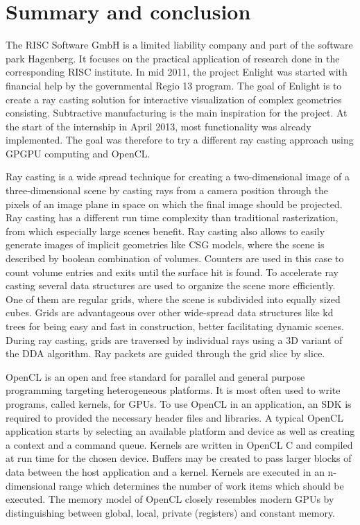 \section{Summary and conclusion}
\label{sec:summary}

The RISC Software GmbH is a limited liability company and part of the software park Hagenberg. It focuses on the practical application of research done in the corresponding RISC institute. In mid 2011, the project Enlight was started with financial help by the governmental Regio 13 program. The goal of Enlight is to create a ray casting solution for interactive visualization of complex geometries consisting. Subtractive manufacturing is the main inspiration for the project. At the start of the internship in April 2013, most functionality was already implemented. The goal was therefore to try a different ray casting approach using GPGPU computing and OpenCL.

Ray casting is a wide spread technique for creating a two-dimensional image of a three-dimensional scene by casting rays from a camera position through the pixels of an image plane in space on which the final image should be projected. Ray casting has a different run time complexity than traditional rasterization, from which especially large scenes benefit. Ray casting also allows to easily generate images of implicit geometries like CSG models, where the scene is described by boolean combination of volumes. Counters are used in this case to count volume entries and exits until the surface hit is found. To accelerate ray casting several data structures are used to organize the scene more efficiently. One of them are regular grids, where the scene is subdivided into equally sized cubes. Grids are advantageous over other wide-spread data structures like kd trees for being easy and fast in construction, better facilitating dynamic scenes. During ray casting, grids are traversed by individual rays using a 3D variant of the DDA algorithm. Ray packets are guided through the grid slice by slice.

OpenCL is an open and free standard for parallel and general purpose programming targeting heterogeneous platforms. It is most often used to write programs, called kernels, for GPUs. To use OpenCL in an application, an SDK is required to provided the necessary header files and libraries. A typical OpenCL application starts by selecting an available platform and device as well as creating a context and a command queue. Kernels are written in OpenCL C and compiled at run time for the chosen device. Buffers may be created to pass larger blocks of data between the host application and a kernel. Kernels are executed in an n-dimensional range which determines the number of work items which should be executed. The memory model of OpenCL closely resembles modern GPUs by distinguishing between global, local, private (registers) and constant memory.

